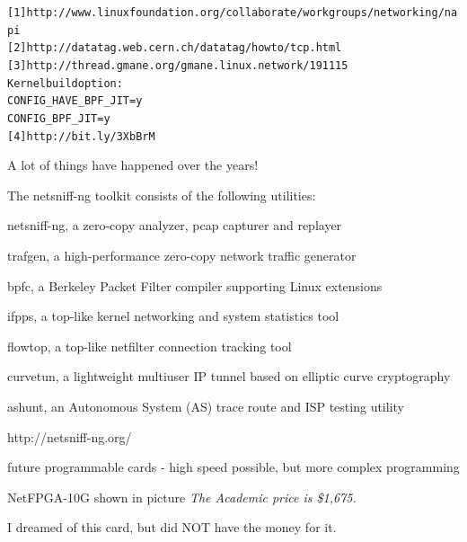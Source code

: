 \documentclass[Screen16to9,17pt]{foils}
\begin{document}
\begin{alltt}\small
[1] http://www.linuxfoundation.org/collaborate/workgroups/networking/napi
[2] http://datatag.web.cern.ch/datatag/howto/tcp.html
[3] http://thread.gmane.org/gmane.linux.network/191115
    Kernel build option:
      CONFIG_HAVE_BPF_JIT=y
      CONFIG_BPF_JIT=y
[4] http://bit.ly/3XbBrM
\end{alltt}

A lot of things have happened over the years!


The netsniff-ng toolkit consists of the following utilities:

\begin{list2}
\item netsniff-ng, a zero-copy analyzer, pcap capturer and replayer
\item trafgen, a high-performance zero-copy network traffic generator
\item bpfc, a Berkeley Packet Filter compiler supporting Linux extensions
\item ifpps, a top-like kernel networking and system statistics tool
\item flowtop, a top-like netfilter connection tracking tool
\item curvetun, a lightweight multiuser IP tunnel based on elliptic curve cryptography
\item ashunt, an Autonomous System (AS) trace route and ISP testing utility
\end{list2}


http://netsniff-ng.org/




\begin{list1}
\item future programmable cards  - high speed possible, but more complex programming
\item {}
\item {}
\item NetFPGA-10G shown in picture \emph{The Academic price is \$1,675.}
\end{list1}

I dreamed of this card, but did NOT have the money for it.


\end{document}
